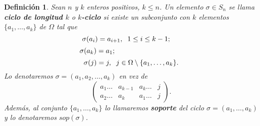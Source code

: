 \documentclass[12pt]{article}
\newtheorem{definition}[theorem]{Definición}
\begin{document}
\begin{definition} Sean $n$ y $k$ enteros positivos, $k \leq n$. Un elemento $\sigma \in S_{n}$ se llama \textbf{ciclo de longitud $k$} o \textbf{$k$-ciclo} si existe un subconjunto con $k$ elementos $\lbrace a_{1}, \ldots, a_{k} \rbrace$ de $\Omega$ tal que 
$$\sigma (a_{i}) = a_{i+1}, \hspace{0.2cm} 1 \leq i \leq k-1;\hspace{0.5cm}$$ 
$$\sigma (a_{k}) = a_{1}; \hspace{3.4cm}$$ $$\sigma (j) = j, \hspace{0.2cm} j \in \Omega \setminus \lbrace a_{1}, \ldots , a_{k} \rbrace.$$ 
Lo denotaremos $\sigma = (a_{1}, a_{2}, \ldots, a_{k})$ en vez de $$\left(
\begin{matrix}
a_{1}\ldots &a_{k-1} &a_{k} \ldots &j \\
a_{2}\ldots &a_{k} &a_{1} \ldots &j
\end{matrix}
\right).
$$
Además, al conjunto $\lbrace a_{1}, \ldots, a_{k}\rbrace$ lo llamaremos \textbf{soporte} del ciclo $\sigma = (a_{1}, \ldots, a_{k})$ y lo denotaremos $sop(\sigma)$.
\end{definition}
\end{document}

